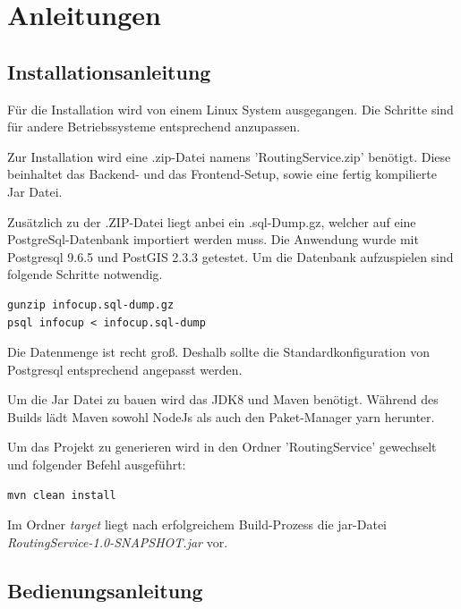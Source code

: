\documentclass[
ngerman          %
,a4paper          %
,11pt
,pdftex
]{report}
\begin{document}
\newpage
\appendix

\chapter{Anleitungen}
\section*{Installationsanleitung}
\label{label:installation}
Für die Installation wird von einem Linux System ausgegangen. Die Schritte sind für andere Betriebssysteme entsprechend anzupassen.

Zur Installation wird eine .zip-Datei namens 'RoutingService.zip' benötigt. Diese beinhaltet das Backend- und das Frontend-Setup, sowie eine fertig kompilierte Jar Datei.

Zusätzlich zu der .ZIP-Datei liegt anbei ein .sql-Dump.gz, welcher auf eine PostgreSql-Datenbank importiert werden muss. Die Anwendung wurde mit Postgresql 9.6.5 und PostGIS 2.3.3 getestet. Um die Datenbank aufzuspielen sind folgende Schritte notwendig.

\begin{lstlisting}
gunzip infocup.sql-dump.gz
psql infocup < infocup.sql-dump
\end{lstlisting}

Die Datenmenge ist recht groß. Deshalb sollte die Standardkonfiguration von Postgresql entsprechend angepasst werden.

Um die Jar Datei zu bauen wird das JDK8 und Maven benötigt. Während des Builds lädt Maven sowohl NodeJs als auch den Paket-Manager yarn herunter.

Um das Projekt zu generieren wird in den Ordner 'RoutingService' gewechselt und folgender Befehl ausgeführt:
\begin{lstlisting}
mvn clean install
\end{lstlisting}
Im Ordner {\em target} liegt nach erfolgreichem Build-Prozess die jar-Datei {\em RoutingService-1.0-SNAPSHOT.jar} vor.

\section*{Bedienungsanleitung}
\end{document}
